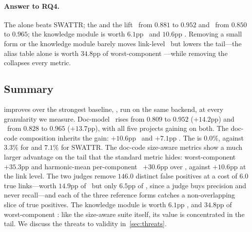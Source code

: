 \begin{rqanswer}
\paragraph{Answer to RQ4.}
The \linkerB{} alone beats SWATTR; the \linkerD{} and the \linkerC{} lift \avgfone\ from $0.881$ to $0.952$ and \avgftwo\ from $0.850$ to $0.965$; the knowledge module is worth $6.1$pp \avgfone\ and $10.6$pp \avgftwo.
Removing a small form or the knowledge module barely moves link-level \fone\ but lowers the tail---the alias table alone is worth $34.8$pp of worst-component \fone---while removing the \linkerB{} collapses every metric.
\end{rqanswer}

\subsection{Summary}
\label{sec:results:summary}

\approach{} improves over the strongest baseline, \Artemis{}, run on the same backend, at every granularity we measure.
Doc-model \avgfone\ rises from $0.809$ to $0.952$ ($+14.2$pp) and \avgftwo\ from $0.828$ to $0.965$ ($+13.7$pp), with all five projects gaining on both.
The doc-code composition inherits the gain: $+10.6$pp \avgfone\ and $+7.1$pp \avgftwo.
The \cmrname{} is $0.0\%$, against $3.3\%$ for \Artemis{} and $7.1\%$ for SWATTR.
The doc-code size-aware metrics show a much larger advantage on the tail that the standard metric hides: worst-component \fone\ $+35.3$pp and harmonic-mean per-component \fone\ $+30.6$pp over \Artemis{}, against $+10.6$pp at the link level.
The two judges remove $146.0$ distinct false positives at a cost of $6.0$ true links---worth $14.9$pp of \fone\ but only $6.5$pp of \ftwo, since a judge buys precision and never recall---and each of the three reference forms catches a non-overlapping slice of true positives.
The knowledge module is worth $6.1$pp \avgfone, and $34.8$pp of worst-component \fone: like the size-aware suite itself, its value is concentrated in the tail.
We discuss the threats to validity in~\autoref{sec:threats}.

